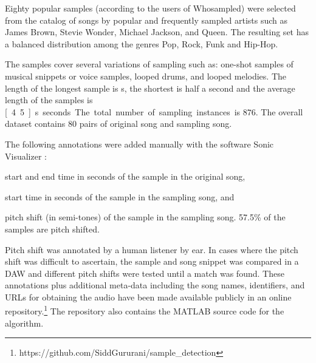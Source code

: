 \documentclass{article}
\begin{document}
Eighty popular samples (according to the users of Whosampled) were selected from the catalog of songs by popular and frequently sampled artists such as James Brown, Stevie Wonder, Michael Jackson, and Queen. The resulting set has a balanced distribution among the genres Pop, Rock, Funk and Hip-Hop.

The samples cover several variations of sampling such as: one-shot samples of musical snippets or voice samples, looped drums, and looped melodies. The length of the longest sample is \unit[25]{s}, the shortest is half a second and the average length of the samples is \unit[4.5]{s} seconds. The total number of sampling instances is $876$. %
The overall dataset contains $80$ pairs of original song and sampling song.

The following annotations were added manually with the software Sonic Visualizer \cite{SonicVisualiser}:
\begin{inparaenum}[(i)]
    \item   start and end time in seconds of the sample in the original song,
    \item   start time in seconds of the sample in the sampling song, and
    \item   pitch shift (in semi-tones) of the sample in the sampling song. 57.5\% of the samples are pitch shifted.
\end{inparaenum}
Pitch shift was annotated by a human listener by ear. In cases where the pitch shift was difficult to ascertain, the sample and song snippet was compared in a DAW and different pitch shifts were tested until a match was found.
These annotations plus additional meta-data including the song names, identifiers, and URLs for obtaining the audio have been made available publicly in an online repository.\footnote{https://github.com/SiddGururani/sample\_detection} The repository also contains the MATLAB source code for the algorithm. 
\end{document}
